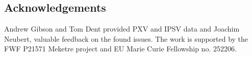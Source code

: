 \subsection*{Acknowledgements}

Andrew Gibson and Tom Dent provided PXV and IPSV data and Joachim Neubert, valuable feedback on the found issues. The work is supported by the FWF P21571 Meketre project and EU Marie Curie Fellowship no. 252206.

